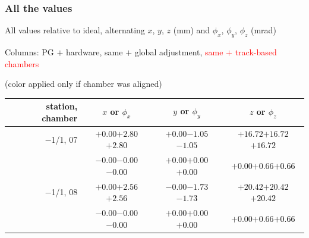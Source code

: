 \documentclass[compress]{beamer}
\begin{document}
\begin{frame}
\frametitle{All the values}
\tiny

All values relative to ideal, alternating $x$, $y$, $z$ (mm) and $\phi_x$, $\phi_y$, $\phi_z$ (mrad)

Columns: PG $+$ hardware, same $+$ global adjustment, \textcolor{red}{same $+$ track-based chambers}

\hfill (color applied only if chamber was aligned)

\vfill
\renewcommand{\arraystretch}{1.1}
\begin{tabular}{r | c | c | c}
station, chamber & $x$ or $\phi_x$ & $y$ or $\phi_y$ & $z$ or $\phi_z$ \\\hline
$-$1/1, 07 & $+0.00$\hspace{0.1 cm}$+2.80$\hspace{0.1 cm}\textcolor{black}{$+2.80$} & $+0.00$\hspace{0.1 cm}$-1.05$\hspace{0.1 cm}\textcolor{black}{$-1.05$} & $+16.72$\hspace{0.1 cm}$+16.72$\hspace{0.1 cm}\textcolor{black}{$+16.72$} \\
           & $-0.00$\hspace{0.1 cm}$-0.00$\hspace{0.1 cm}\textcolor{black}{$-0.00$} & $+0.00$\hspace{0.1 cm}$+0.00$\hspace{0.1 cm}\textcolor{black}{$+0.00$} & $+0.00$\hspace{0.1 cm}$+0.66$\hspace{0.1 cm}\textcolor{black}{$+0.66$} \\
$-$1/1, 08 & $+0.00$\hspace{0.1 cm}$+2.56$\hspace{0.1 cm}\textcolor{black}{$+2.56$} & $-0.00$\hspace{0.1 cm}$-1.73$\hspace{0.1 cm}\textcolor{black}{$-1.73$} & $+20.42$\hspace{0.1 cm}$+20.42$\hspace{0.1 cm}\textcolor{black}{$+20.42$} \\
           & $-0.00$\hspace{0.1 cm}$-0.00$\hspace{0.1 cm}\textcolor{black}{$-0.00$} & $+0.00$\hspace{0.1 cm}$+0.00$\hspace{0.1 cm}\textcolor{black}{$+0.00$} & $+0.00$\hspace{0.1 cm}$+0.66$\hspace{0.1 cm}\textcolor{black}{$+0.66$} \\

\end{tabular}
\end{frame}
\end{document}
